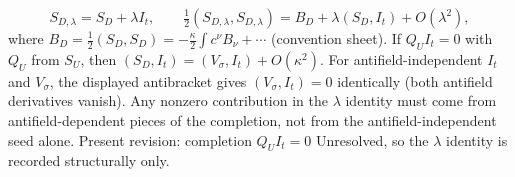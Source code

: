 \begin{equation}
S_{D,\lambda}=S_D+\lambda I_t,
\qquad
\tfrac12(S_{D,\lambda},S_{D,\lambda})
=B_D+\lambda(S_D,I_t)+O(\lambda^2),
\end{equation}
where $B_D=\tfrac12(S_D,S_D)=-\frac\kappa2\int c^\nu B_\nu+\cdots$ (convention sheet).
If $Q_U I_t=0$ with $Q_U$ from $S_U$, then
$(S_D,I_t)=(V_\sigma,I_t)+O(\kappa^2)$.
For antifield-independent $I_t$ and $V_\sigma$, the displayed antibracket gives
$(V_\sigma,I_t)=0$ identically (both antifield derivatives vanish). Any nonzero
contribution in the $\lambda$ identity must come from antifield-dependent pieces of
the completion, not from the antifield-independent seed alone.
Present revision: completion $Q_U I_t=0$ Unresolved, so the $\lambda$ identity is
recorded structurally only.
